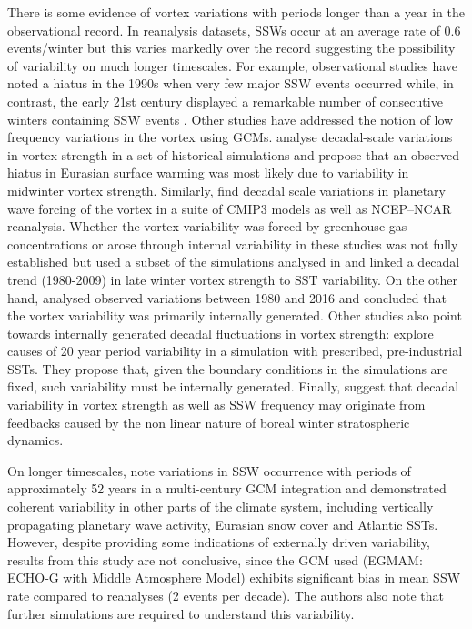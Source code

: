 There is some evidence of vortex variations with periods longer than a year in the observational record. In reanalysis datasets, SSWs occur at an average rate of 0.6 events/winter but this varies markedly over the record \citep{Butler2015} suggesting the possibility of variability on much longer timescales. For example, observational studies have noted a hiatus in the 1990s when very few major SSW events occurred \citep{Butler2015,Pawson1999,Shindell1999} while, in contrast, the early 21st century displayed a remarkable number of consecutive winters containing SSW events \citep{Manney2005}. Other studies have addressed the notion of low frequency variations in the vortex using GCMs. \cite{Garfinkel2017} analyse decadal-scale variations in vortex strength in a set of historical simulations and propose that an observed hiatus in Eurasian surface warming was most likely due to variability in midwinter vortex strength. Similarly, \cite{cohen2009} find decadal scale variations in planetary wave forcing of the vortex in a suite of CMIP3 models as well as NCEP–NCAR reanalysis. Whether the vortex variability was forced by greenhouse gas concentrations or arose through internal variability in these studies was not fully established but \cite{Garfinkel2015} used a subset of the simulations analysed in \cite{Garfinkel2017} and linked a decadal trend (1980-2009) in late winter vortex strength to SST variability. On the other hand, \cite{Seviour2017} analysed observed variations between 1980 and 2016 and concluded that the vortex variability was primarily internally generated. Other studies also point towards internally generated decadal fluctuations in vortex strength: \cite{Manzini2012} explore causes of 20 year period variability in a simulation with prescribed, pre-industrial SSTs. They propose that, given the boundary conditions in the simulations are fixed, such variability must be internally generated. Finally, \cite{Butchart2000} suggest that decadal variability in vortex strength as well as SSW frequency may originate from feedbacks caused by the non linear nature of boreal winter stratospheric dynamics.

On longer timescales, \cite{Schimanke2011} note variations in SSW occurrence with periods of approximately 52 years in a multi-century GCM integration and demonstrated coherent variability in other parts of the climate system, including vertically propagating planetary wave activity, Eurasian snow cover and Atlantic SSTs. However, despite providing some indications of externally driven variability, results from this study are not conclusive, since the GCM used (EGMAM: ECHO‐G with Middle Atmosphere Model) exhibits significant bias in mean SSW rate compared to reanalyses (2 events per decade). The authors also note that further simulations are required to understand this variability. 

